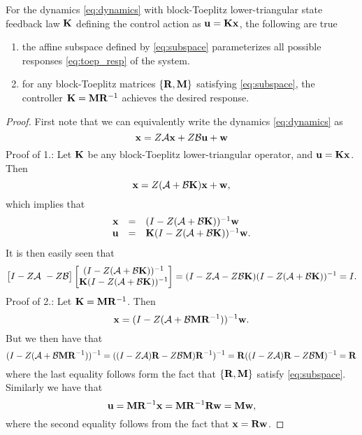 \documentclass[11pt]{article}
\numberwithin{equation}{section}
\begin{document}
\begin{theorem}
For the dynamics \eqref{eq:dynamics} with block-Toeplitz lower-triangular state feedback law $\mathbf{K}$ defining the control action as $\mathbf{u} = \mathbf{K} \mathbf{x}$, the following are true
\begin{enumerate}
\item the affine subspace defined by \eqref{eq:subspace} parameterizes all possible responses \eqref{eq:toep_resp} of the system.
\item for any block-Toeplitz matrices $\{\mathbf{R}, \mathbf{M}\}$ satisfying \eqref{eq:subspace}, the controller $\mathbf{K} = \mathbf{M} \mathbf{R}^{-1}$ achieves the desired response.
\end{enumerate}
\label{thm:param}
\end{theorem}
\begin{proof}
First note that we can equivalently write the dynamics \eqref{eq:dynamics} as
\begin{equation}
\mathbf{x} = Z\mathcal{A} \mathbf{x}+ Z\mathcal{B} \mathbf{u} + \mathbf{w}
\end{equation}
Proof of 1.: Let $\mathbf{K}$ be any block-Toeplitz lower-triangular operator, and $\mathbf{u} = \mathbf{K} \mathbf{x}$.  Then
\begin{equation}
\mathbf{x} = Z(\mathcal{A}+\mathcal{B}\mathbf{K})\mathbf{x} + \mathbf{w},
\end{equation}
which implies that
\begin{equation}
\begin{array}{rcl}
\mathbf{x} &=& (I-Z(\mathcal{A}+\mathcal{B}\mathbf{K}))^{-1}\mathbf{w} \\
\mathbf{u} &=& \mathbf{K}(I-Z(\mathcal{A}+\mathcal{B}\mathbf{K}))^{-1}\mathbf{w}.
\end{array}
\end{equation}
It is then easily seen that
\begin{equation}
\begin{bmatrix} I - Z\A \ -Z\B\end{bmatrix}\begin{bmatrix}(I-Z(\A+\B\tf K))^{-1} \\ \tf K (I-Z(\A+\B\tf K))^{-1} \end{bmatrix} = (I - Z\A -Z\B\tf K)(I-Z(\A+\B\tf K))^{-1} = I.
\end{equation}
Proof of 2.: Let $\mathbf{K} = \mathbf{M} \mathbf{R}^{-1}$.  Then
\begin{equation}
\mathbf{x} = (I-Z(\mathcal{A}+\mathcal{B}\mathbf{M} \mathbf{R}^{-1}))^{-1}\mathbf{w}.
\end{equation}
But we then have that
\begin{equation}
(I-Z(\mathcal{A}+\mathcal{B}\mathbf{M} \mathbf{R}^{-1}))^{-1} = ((I-Z\mathcal{A})\mathbf{R} - Z\mathcal{B} \mathbf{M})\mathbf{R}^{-1})^{-1} = \mathbf{R} ((I-Z\mathcal{A})\mathbf{R} - Z\mathcal{B} \mathbf{M})^{-1}  = \mathbf{R}
\end{equation}
where the last equality follows form the fact that $\{\mathbf{R}, \mathbf{M}\}$ satisfy \eqref{eq:subspace}.  Similarly we have that
\begin{equation}
\mathbf{u} = \mathbf{M} \mathbf{R}^{-1}\mathbf{x} = \mathbf{M} \mathbf{R}^{-1} \mathbf{R} \mathbf{w} = \mathbf{M} \mathbf{w},
\end{equation}
where the second equality follows from the fact that $\mathbf{x} = \mathbf{R} \mathbf{w}$.
\end{proof}
\end{document}
